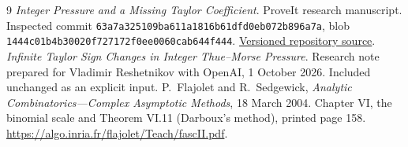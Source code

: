 \documentclass[11pt,a4paper]{article}
\theoremstyle{remark}\newtheorem*{ednote}{Editorial note (ProveIt, 2026-10-01)}
\begin{document}
\begin{thebibliography}{9}\small
{}\emph{Integer Pressure and a Missing Taylor Coefficient}. ProveIt research manuscript. Inspected commit \nolinkurl{63a7a325109ba611a1816b61dfd0eb072b896a7a}, blob \nolinkurl{1444c01b4b30020f727172f0ee0060cab644f444}.\newline
\href{https://github.com/VladimirReshetnikov/ProveIt/blob/63a7a325109ba611a1816b61dfd0eb072b896a7a/Analysis/FabiusFunction/docs/semi-formalized-research-frontiers/drafts/thue-morse/Thue_Morse_Integer_Pressure/article.tex}{Versioned repository source}.
\emph{Infinite Taylor Sign Changes in Integer Thue--Morse Pressure}. Research note prepared for Vladimir Reshetnikov with OpenAI, 1 October 2026. Included unchanged as an explicit input.
P.~Flajolet and R.~Sedgewick, \emph{Analytic Combinatorics---Complex Asymptotic Methods}, 18 March 2004. Chapter VI, the binomial scale and Theorem VI.11 (Darboux's method), printed page 158.\newline
\url{https://algo.inria.fr/flajolet/Teach/fascII.pdf}.
\end{thebibliography}
\end{document}
